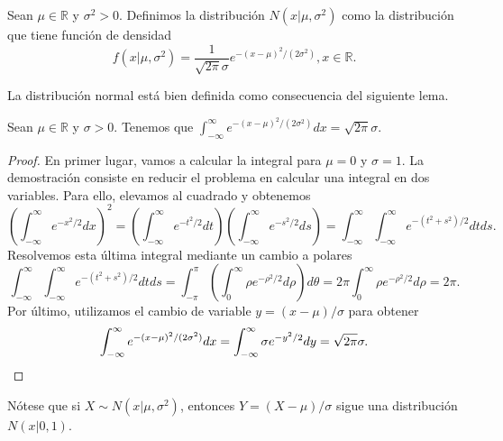 \documentclass{article}
\begin{document}
\begin{definition}
    Sean $\mu \in \mathbb{R}$ y $\sigma^2 > 0$. Definimos la distribución $N(x | \mu, \sigma^2)$ como la distribución que tiene función de densidad
    \[f(x | \mu, \sigma^2) = \frac{1}{\sqrt{2\pi}\sigma}e^{-(x-\mu)^2 / (2\sigma^2)}, x \in \mathbb{R}.\]
\end{definition}

La distribución normal está bien definida como consecuencia del siguiente lema.
\begin{lem}
    Sean $\mu \in \mathbb{R}$ y $\sigma > 0$. Tenemos que $\int_{-\infty}^\infty e^{-(x-\mu)^2 / (2\sigma^2)}dx = \sqrt{2\pi}\sigma.$
\end{lem}
\begin{proof}
    En primer lugar, vamos a calcular la integral para $\mu = 0$ y $\sigma = 1$. La demostración consiste en reducir el problema en calcular una integral en dos variables. Para ello, elevamos al cuadrado y obtenemos
    \[\left(\int_{-\infty}^\infty e^{-x^2 / 2}dx\right)^2 = \left(\int_{-\infty}^\infty e^{-t^2 / 2}dt\right) \left(\int_{-\infty}^\infty e^{-s^2 / 2}ds \right) = \int_{-\infty}^\infty \int_{-\infty}^\infty e^{-(t^2+s^2) / 2} dt ds. \]
    Resolvemos esta última integral mediante un cambio a polares
    \[\int_{-\infty}^\infty \int_{-\infty}^\infty e^{-(t^2+s^2) / 2} dt ds = \int_{-\pi}^\pi \left(\int_{0}^\infty \rho e^{-\rho^2 / 2} d\rho \right) d\theta = 2\pi \int_{0}^\infty \rho e^{-\rho^2 / 2} d\rho = 2\pi.\]
    Por último, utilizamos el cambio de variable $y = (x - \mu) / \sigma$ para obtener
    \[\int_{-\infty}^\infty e^{-(x-\mu)^2 / (2\sigma^2)}dx = \int_{-\infty}^\infty \sigma e^{-y^2 / 2}dy = \sqrt{2\pi}\sigma. \qedhere\]
\end{proof}

Nótese que si $X \sim N(x | \mu, \sigma^2)$, entonces $Y = (X - \mu)/\sigma$ sigue una distribución $N(x|0,1)$.
\end{document}
